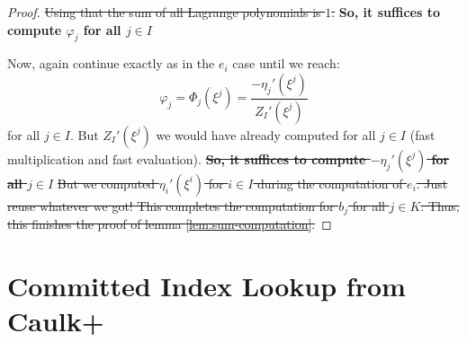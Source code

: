 \documentclass[sigconf]{acmart}
\newcommand{\setind}{I}
\providecommand{\DIFaddtex}[1]{{\protect\color{blue}\uwave{#1}}} %
\providecommand{\DIFdeltex}[1]{{\protect\color{red}\sout{#1}}}                      %
\providecommand{\DIFaddbegin}{} %
\providecommand{\DIFaddend}{} %
\providecommand{\DIFdelbegin}{} %
\providecommand{\DIFdelend}{} %
\providecommand{\DIFadd}[1]{\texorpdfstring{\DIFaddtex{#1}}{#1}} %
\providecommand{\DIFdel}[1]{\texorpdfstring{\DIFdeltex{#1}}{}} %
\newcommand{\DIFscaledelfig}{0.5}
\newlength{\DIFdelgraphicswidth} %
\newlength{\DIFdelgraphicsheight} %
\newcommand{\DIFaddincludegraphics}[2][]{{\color{blue}\fbox{\DIFOincludegraphics[#1]{#2}}}} %
\newcommand{\DIFdelincludegraphics}[2][]{%
	\sbox{\DIFdelgraphicsbox}{\DIFOincludegraphics[#1]{#2}}%
	\settoboxwidth{\DIFdelgraphicswidth}{\DIFdelgraphicsbox} %
	\settoboxtotalheight{\DIFdelgraphicsheight}{\DIFdelgraphicsbox} %
	\scalebox{\DIFscaledelfig}{%
		\parbox[b]{\DIFdelgraphicswidth}{\usebox{\DIFdelgraphicsbox}\\[-\baselineskip] \rule{\DIFdelgraphicswidth}{0em}}\llap{\resizebox{\DIFdelgraphicswidth}{\DIFdelgraphicsheight}{%
				\setlength{\unitlength}{\DIFdelgraphicswidth}%
				\begin{picture}(1,1)%
					\thicklines\linethickness{2pt} %
					{\color[rgb]{1,0,0}\put(0,0){\framebox(1,1){}}}%
					{\color[rgb]{1,0,0}\put(0,0){\line( 1,1){1}}}%
					{\color[rgb]{1,0,0}\put(0,1){\line(1,-1){1}}}%
				\end{picture}%
			}\hspace*{3pt}}} %
} %
\DeclareRobustCommand{\DIFaddbegin}{\DIFOaddbegin \let\includegraphics\DIFaddincludegraphics} %
\DeclareRobustCommand{\DIFaddend}{\DIFOaddend \let\includegraphics\DIFOincludegraphics} %
\DeclareRobustCommand{\DIFdelbegin}{\DIFOdelbegin \let\includegraphics\DIFdelincludegraphics} %
\DeclareRobustCommand{\DIFdelend}{\DIFOaddend \let\includegraphics\DIFOincludegraphics} %
\begin{document}
\begin{proof}
		\DIFdelbegin \DIFdel{Using that the sum of all Lagrange polynomials is $1$. }\DIFdelend \textbf{So, it suffices to compute $\varphi_j$ for all $j \in \setind$}
		
		Now, again continue exactly as in the \DIFdelbegin \DIFdel{$e_i$ }\DIFdelend \DIFaddbegin \DIFadd{$a_i$ }\DIFaddend case until we reach:
		$$\varphi_j =\Phi_j(\xi^j) = \frac{-\eta_j'(\xi^j)}{Z_I'(\xi^j)}$$
			for all $j \in \setind$. But $Z_I'(\xi^j)$ we would have already computed for all $j \in \setind$ (fast multiplication and fast evaluation). %
		\textbf{\DIFdel{So, it suffices to compute $-\eta_j'(\xi^j)$ for all $j \in \setind$}%
		}
		\DIFdel{But we computed $\eta_i'(\xi^i)$ for $i\in \setind$ during the computation of $e_i$. Just reuse whatever we got!
			This completes the computation for $b_j$ for all $j \in K$.
			Thus, this finishes the proof of lemma \ref{lem:sum-computation}.
		}%
	\end{proof}
	
	
	
	\section{Committed Index Lookup from Caulk+}\label{app:committed-index-lookup}
	
\end{document}
